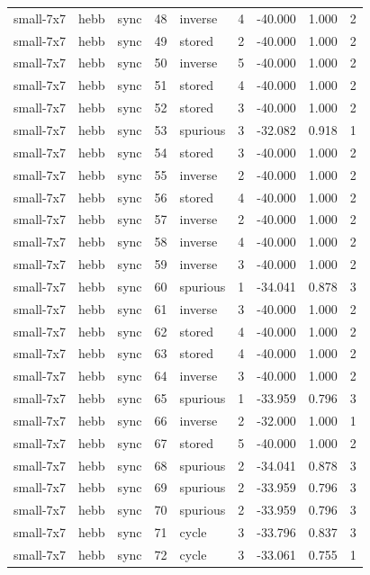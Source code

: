 \begin{tabular}{lllrlrrrr}
small-7x7 & hebb & sync & 48 & inverse & 4 & -40.000 & 1.000 & 2 \\
small-7x7 & hebb & sync & 49 & stored & 2 & -40.000 & 1.000 & 2 \\
small-7x7 & hebb & sync & 50 & inverse & 5 & -40.000 & 1.000 & 2 \\
small-7x7 & hebb & sync & 51 & stored & 4 & -40.000 & 1.000 & 2 \\
small-7x7 & hebb & sync & 52 & stored & 3 & -40.000 & 1.000 & 2 \\
small-7x7 & hebb & sync & 53 & spurious & 3 & -32.082 & 0.918 & 1 \\
small-7x7 & hebb & sync & 54 & stored & 3 & -40.000 & 1.000 & 2 \\
small-7x7 & hebb & sync & 55 & inverse & 2 & -40.000 & 1.000 & 2 \\
small-7x7 & hebb & sync & 56 & stored & 4 & -40.000 & 1.000 & 2 \\
small-7x7 & hebb & sync & 57 & inverse & 2 & -40.000 & 1.000 & 2 \\
small-7x7 & hebb & sync & 58 & inverse & 4 & -40.000 & 1.000 & 2 \\
small-7x7 & hebb & sync & 59 & inverse & 3 & -40.000 & 1.000 & 2 \\
small-7x7 & hebb & sync & 60 & spurious & 1 & -34.041 & 0.878 & 3 \\
small-7x7 & hebb & sync & 61 & inverse & 3 & -40.000 & 1.000 & 2 \\
small-7x7 & hebb & sync & 62 & stored & 4 & -40.000 & 1.000 & 2 \\
small-7x7 & hebb & sync & 63 & stored & 4 & -40.000 & 1.000 & 2 \\
small-7x7 & hebb & sync & 64 & inverse & 3 & -40.000 & 1.000 & 2 \\
small-7x7 & hebb & sync & 65 & spurious & 1 & -33.959 & 0.796 & 3 \\
small-7x7 & hebb & sync & 66 & inverse & 2 & -32.000 & 1.000 & 1 \\
small-7x7 & hebb & sync & 67 & stored & 5 & -40.000 & 1.000 & 2 \\
small-7x7 & hebb & sync & 68 & spurious & 2 & -34.041 & 0.878 & 3 \\
small-7x7 & hebb & sync & 69 & spurious & 2 & -33.959 & 0.796 & 3 \\
small-7x7 & hebb & sync & 70 & spurious & 2 & -33.959 & 0.796 & 3 \\
small-7x7 & hebb & sync & 71 & cycle & 3 & -33.796 & 0.837 & 3 \\
small-7x7 & hebb & sync & 72 & cycle & 3 & -33.061 & 0.755 & 1 \\

\end{tabular}
